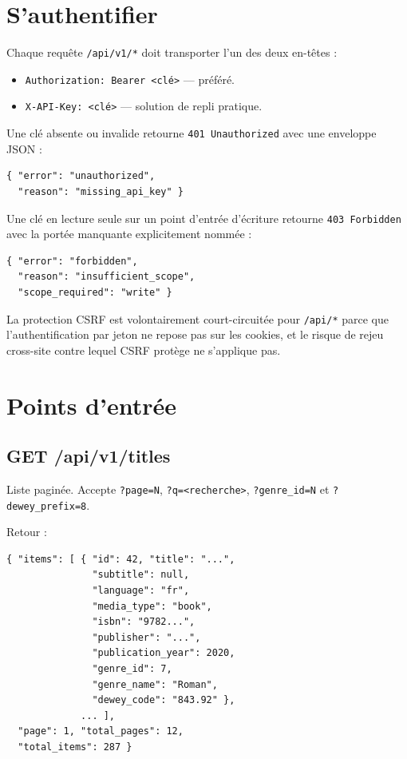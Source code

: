 \section{S'authentifier}

Chaque requête \texttt{/api/v1/*} doit transporter l'un des deux
en-têtes :

\begin{itemize}
  \item \texttt{Authorization: Bearer <clé>} — préféré.
  \item \texttt{X-API-Key: <clé>} — solution de repli pratique.
\end{itemize}

Une clé absente ou invalide retourne \texttt{401 Unauthorized} avec
une enveloppe JSON :

\begin{verbatim}
{ "error": "unauthorized",
  "reason": "missing_api_key" }
\end{verbatim}

Une clé en lecture seule sur un point d'entrée d'écriture retourne
\texttt{403 Forbidden} avec la portée manquante explicitement nommée :

\begin{verbatim}
{ "error": "forbidden",
  "reason": "insufficient_scope",
  "scope_required": "write" }
\end{verbatim}

La protection CSRF est volontairement court-circuitée pour
\texttt{/api/*} parce que l'authentification par jeton ne repose
pas sur les cookies, et le risque de rejeu cross-site contre lequel
CSRF protège ne s'applique pas.

\section{Points d'entrée}

\subsection{GET /api/v1/titles}

Liste paginée. Accepte \texttt{?page=N},
\texttt{?q=<recherche>}, \texttt{?genre\_id=N} et
\texttt{?dewey\_prefix=8}.

Retour :

\begin{verbatim}
{ "items": [ { "id": 42, "title": "...",
               "subtitle": null,
               "language": "fr",
               "media_type": "book",
               "isbn": "9782...",
               "publisher": "...",
               "publication_year": 2020,
               "genre_id": 7,
               "genre_name": "Roman",
               "dewey_code": "843.92" },
             ... ],
  "page": 1, "total_pages": 12,
  "total_items": 287 }
\end{verbatim}

